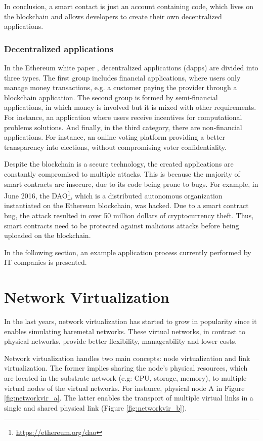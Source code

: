 In conclusion, a smart contact is just an account containing code, which lives on the blockchain and allows developers to create their own decentralized applications. 

\subsubsection{Decentralized applications}

In the Ethereum white paper \cite{buterin2014next}, decentralized applications (dapps) are divided into three types. The first group includes financial applications, where users only manage money transactions, e.g. a customer paying the provider through a blockchain application. The second group is formed by semi-financial applications, in which money is involved but it is mixed with other requirements. For instance, an application where users receive incentives for computational problems solutions. And finally, in the third category, there are non-financial applications. For instance, an online voting platform providing a better transparency into elections, without compromising voter confidentiality.

Despite the blockchain is a secure technology, the created applications are constantly compromised to multiple attacks. This is because the majority of smart contracts are insecure, due to its code being prone to bugs. For example, in June 2016, the DAO\footnote{\url{https://ethereum.org/dao}}, which is a distributed autonomous organization instantiated on the Ethereum blockchain, was hacked. Due to a smart contract bug, the attack resulted in over 50 million dollars of cryptocurrency theft. Thus, smart contracts need to be protected against malicious attacks before being uploaded on the blockchain.

In the following section, an example application process currently performed by IT companies is presented.


\section{Network Virtualization} \label{networkvirtualization}

In the last years, network virtualization has started to grow in popularity since it enables simulating baremetal networks. These virtual networks, in contrast to physical networks, provide better flexibility, manageability and lower costs. 

Network virtualization handles two main concepts: node virtualization and link virtualization. The former implies sharing the node's physical resources, which are located in the substrate network (e.g: CPU, storage, memory), to multiple virtual nodes of the virtual networks. For instance, physical node A in Figure \ref{fig:networkvir_a}. The latter enables the transport of multiple virtual links in a single and shared physical link (Figure \ref{fig:networkvir_b}).


